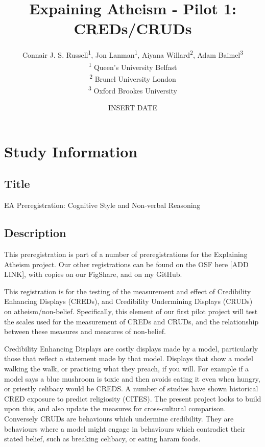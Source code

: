 \documentclass[]{article}
\title{Expaining Atheism - Pilot 1: CREDs/CRUDs}
\author{
          Connair J. S. Russell\textsuperscript{1},
          Jon Lanman\textsuperscript{1},
          Aiyana Willard\textsuperscript{2},
          Adam Baimel\textsuperscript{3}          \\ \vspace{0.5cm}
              \textsuperscript{1} Queen's University Belfast\\
              \textsuperscript{2} Brunel University London\\
              \textsuperscript{3} Oxford Brookes University      }
\date{INSERT DATE}
\newcounter{question}
\begin{document}
\maketitle
\vspace{2pc}


\ifPDFTeX
  \newcommand\Question[2]{%
   \leavevmode\par
   \stepcounter{question}
   \noindent
   \textbf{\thequestion. #1}. #2\par}
\else %
  \NewCommandCopy{\oldQuestion}{\Question}
  \renewcommand\Question[2]{%
   \leavevmode\par
   \stepcounter{question}
   \noindent
   \textbf{\thequestion. #1}. #2\par}
\fi



\newcommand\Answer[1]{%
    \noindent
    \textit{Registered response}: #1\par}

\hypertarget{study-information}{%
\section{Study Information}\label{study-information}}

\hypertarget{title}{%
\subsection{Title}\label{title}}

EA Preregistration: Cognitive Style and Non-verbal Reasoning

\hypertarget{description}{%
\subsection{Description}\label{description}}

This preregistration is part of a number of preregistrations for the
Explaining Atheism project. Our other registrations can be found on the
OSF here {[}ADD LINK{]}, with copies on our FigShare, and on my GitHub.

This registration is for the testing of the measurement and effect of
Credibility Enhancing Displays (CREDs), and Credibility Undermining
Displays (CRUDs) on atheism/non-belief. Specifically, this element of
our first pilot project will test the scales used for the measurement of
CREDs and CRUDs, and the relationship between these measures and
measures of non-belief.

Credibility Enhancing Displays are costly displays made by a model,
particularly those that reflect a statement made by that model. Displays
that show a model walking the walk, or practicing what they preach, if
you will. For example if a model says a blue mushroom is toxic and then
avoids eating it even when hungry, or priestly celibacy would be CREDS.
A number of studies have shown historical CRED exposure to predict
religiosity (CITES). The present project looks to build upon this, and
also update the measures for cross-cultural comparison. Conversely CRUDs
are behaviours which undermine credibility. They are behaviours where a
model might engage in behaviours which contradict their stated belief,
such as breaking celibacy, or eating haram foods.
\end{document}
